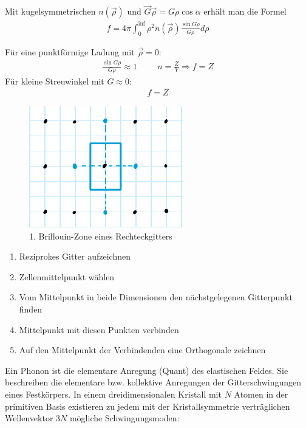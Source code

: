 Mit kugelsymmetrischen $n(\vec{\rho})$ und $\vec{G} \vec{\rho} = G \rho \cos{\alpha}$ erhält man die Formel
\begin{align}
f = 4 \pi \int_0 ^{\inf} \rho^2 n(\vec{\rho}) \frac{\sin{G \rho}}{G \rho} d\rho
\end{align}

Für eine punktförmige Ladung mit $\vec{\rho} = 0$:
\begin{align}
\frac{\sin{G \rho}}{G \rho} \approx 1 \hspace{1cm} n = \frac{Z}{V} \Rightarrow f = Z
\end{align}
Für kleine Streuwinkel mit $G \approx 0$:
\begin{align}
f = Z
\end{align}

\label{q:28}

\begin{figure}[H]
    \centering
    \begin{samepage}
        \includegraphics[width=0.4\linewidth]{resources/09-05-2012/BZ1.pdf}
        \caption[1. BZ Rechteckgitter]{1. Brillouin-Zone eines Rechteckgitters}
        \label{fig:BZ1_rechteckgitter}
    \end{samepage}
\end{figure}
\begin{enumerate}
    \item Reziprokes Gitter aufzeichnen
    \item Zellenmittelpunkt wählen
    \item Vom Mittelpunkt in beide Dimensionen den nächstgelegenen Gitterpunkt finden
    \item Mittelpunkt mit diesen Punkten verbinden
    \item Auf den Mittelpunkt der Verbindenden eine Orthogonale zeichnen
\end{enumerate}

\label{q:29}

Ein Phonon ist die elementare Anregung (Quant) des elastischen Feldes. Sie beschreiben die elementare bzw. kollektive Anregungen der Gitterschwingungen eines Festkörpers.
In einem dreidimensionalen Kristall mit $N$ Atomen in der primitiven Basis existieren zu jedem mit der Kristallsymmetrie verträglichen Wellenvektor 
$3N$ mögliche Schwingungsmoden:

